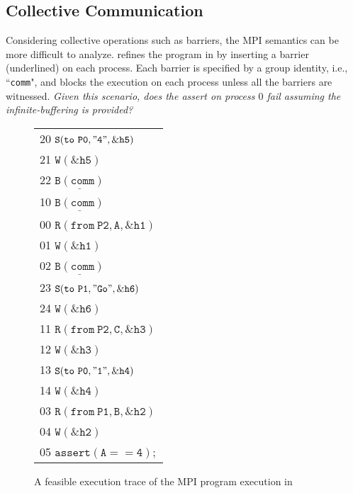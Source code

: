 
\subsection{Collective Communication}
Considering collective operations such as barriers, the MPI semantics can be more difficult to analyze.  refines the program in  by inserting a barrier (underlined) on each process. Each barrier is specified by a group identity, i.e., ``\texttt{comm}", and blocks the execution on each process unless all the barriers are witnessed. \textit{Given this scenario, does the assert on process $0$ fail assuming the infinite-buffering is provided?}

\examplefigoneB

\begin{figure}[c]
\begin{center}
\setlength{\tabcolsep}{2pt}
\small \begin{tabular}[t]{l}
20 $\mathtt{S(to\ P0, "4", \&h5)}$ \\
21 $\mathtt{W(\&h5)}$\\
22 $\mathtt{\underline{B(comm)}}$\\
\hline
10 $\mathtt{\underline{B(comm)}}$\\
\hline
00 $\mathtt{R(from\ P2, A, \&h1)}$ \\
01 $\mathtt{W(\&h1)}$ \\
02 $\mathtt{\underline{B(comm)}}$\\
\hline
23 $\mathtt{S(to\ P1, "Go", \&h6)}$ \\
24 $\mathtt{W(\&h6)}$ \\
\hline
11 $\mathtt{R(from\ P2, C, \&h3)}$ \\
12 $\mathtt{W(\&h3)}$ \\
13 $\mathtt{S(to\ P0, "1", \&h4)}$ \\
14 $\mathtt{W(\&h4)}$ \\
\hline
03 $\mathtt{R(from\ P1, B, \&h2)}$ \\
04 $\mathtt{W(\&h2)}$ \\
05 $\mathtt{assert(A == 4);}$ \\
\hline
\end{tabular}
\end{center}
\caption{A feasible execution trace of the MPI program execution in }
\label{fig:trace3}
\end{figure}

